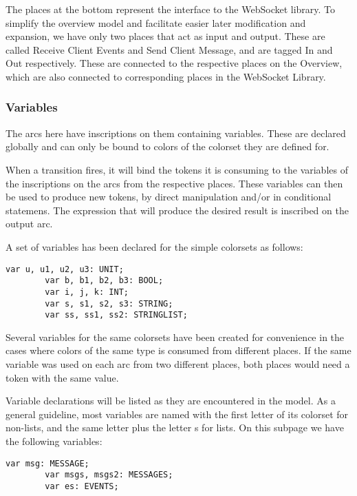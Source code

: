	The places at the bottom represent the interface to the WebSocket library. To
	simplify the overview model and facilitate easier later modification
	and expansion, we have only two places that act as input and output. These are
	called Receive Client Events and Send Client Message, and are tagged In and
	Out respectively. These are connected to the respective places on the
	Overview, which are also connected to corresponding places in the WebSocket
	Library.
	
	
	\subsubsection{Variables}
	
		The arcs here have inscriptions on them containing variables. These are
		declared globally and can only be bound to colors of the colorset they are
		defined for. 
		
		When a transition fires, it will bind the tokens it is consuming to the
		variables of the inscriptions on the arcs from the respective places. These
		variables can then be used to produce new tokens, by direct manipulation
		and/or in conditional statemens. The expression that will produce the desired
		result is inscribed on the output arc. 
		
		A set of variables has been declared for the simple colorsets as follows:
		
		\begin{lstlisting}[label=lst:standard_vars,caption=Simple Colorset Variables]
		var u, u1, u2, u3: UNIT;
		var b, b1, b2, b3: BOOL;
		var i, j, k: INT;
		var s, s1, s2, s3: STRING;
		var ss, ss1, ss2: STRINGLIST;
		\end{lstlisting}
		
		Several variables for the same colorsets have been created for convenience in
		the cases where colors of the same type is consumed from different places. If the same variable was
		used on each arc from two different places, both places would need a token
		with the same value. 
		
		Variable declarations will be listed as they are encountered in the model.
		As a general guideline, most variables are named with the first letter of its
		colorset for non-lists, and the same letter plus the letter s for lists. On
		this subpage we have the following variables:
		
		\begin{lstlisting}[label=lst:client_app_vars,caption=Client Application
		Variables]
		var msg: MESSAGE;
		var msgs, msgs2: MESSAGES;
		var es: EVENTS;
		\end{lstlisting}
	

